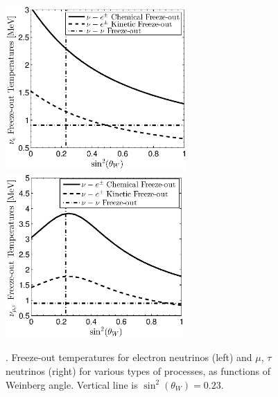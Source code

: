 \begin{figure}[ht]
\centerline{\includegraphics[height=6.3cm]{04-birrell/ParametricStudies/Figures/nu_e_freezeout.eps}\hspace{5mm}\includegraphics[height=6.3cm]{04-birrell/ParametricStudies/Figures/nu_mu_freezeout.eps}}
\caption{.  Freeze-out temperatures for electron neutrinos (left) and $\mu$, $\tau$ neutrinos (right) for various types of processes, as functions of Weinberg angle. Vertical line is $\sin^2(\theta_W)=0.23$.}\label{fig:freezeoutT_B}
 \end{figure}
